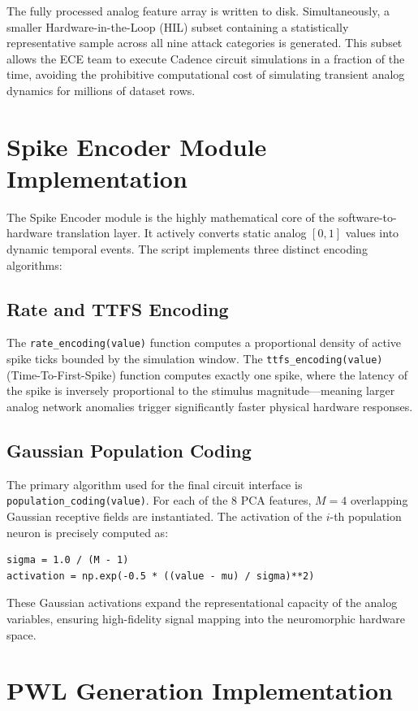The fully processed analog feature array is written to disk. Simultaneously, a smaller Hardware-in-the-Loop (HIL) subset containing a statistically representative sample across all nine attack categories is generated. This subset allows the ECE team to execute Cadence circuit simulations in a fraction of the time, avoiding the prohibitive computational cost of simulating transient analog dynamics for millions of dataset rows.

\section{Spike Encoder Module Implementation}

The Spike Encoder module is the highly mathematical core of the software-to-hardware translation layer. It actively converts static analog $[0, 1]$ values into dynamic temporal events. The script implements three distinct encoding algorithms:

\subsection{Rate and TTFS Encoding}
The \texttt{rate\_encoding(value)} function computes a proportional density of active spike ticks bounded by the simulation window. The \texttt{ttfs\_encoding(value)} (Time-To-First-Spike) function computes exactly one spike, where the latency of the spike is inversely proportional to the stimulus magnitude—meaning larger analog network anomalies trigger significantly faster physical hardware responses.

\subsection{Gaussian Population Coding}
The primary algorithm used for the final circuit interface is \texttt{population\_coding(value)}. For each of the 8 PCA features, $M=4$ overlapping Gaussian receptive fields are instantiated. The activation of the $i$-th population neuron is precisely computed as:
\begin{verbatim}
sigma = 1.0 / (M - 1)
activation = np.exp(-0.5 * ((value - mu) / sigma)**2)
\end{verbatim}
These Gaussian activations expand the representational capacity of the analog variables, ensuring high-fidelity signal mapping into the neuromorphic hardware space. 

\section{PWL Generation Implementation}


